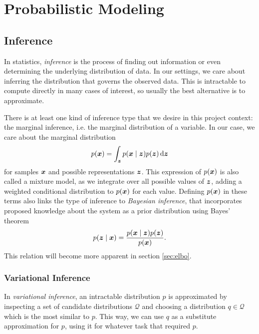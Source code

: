 \chapter{Probabilistic Modeling}


\section{Inference}
In statistics, \textit{inference} is the process of finding out information or even determining the underlying distribution of data. In our settings, we care about inferring the distribution that governs the observed data. This is intractable to compute directly in many cases of interest, so usually the best alternative is to approximate.

There is at least one kind of inference type that we desire in this project context: the marginal inference, i.e. the marginal distribution of a variable. In our case, we care about the marginal distribution 
\begin{equation}
    p(\bm{ x }) = \int_{\bm{ z }} p(\bm{ x } \mid \bm{ z }) p(\bm{ z }) \mathop{}\!\mathrm{d} \bm{ z } \label{eq:marginal_distribution}
\end{equation}
for samples $\bm{ x }$ and possible representations $\bm{ z }$. This expression of $p(\bm{ x })$ is also called a mixture model, as we integrate over all possible values of $\bm{ z }$, adding a weighted conditional distribution to $p(\bm{ x })$ for each value. Defining $p(\bm{ x })$ in these terms also links the type of inference to \textit{Bayesian inference}, that incorporates proposed knowledge about the system as a prior distribution using Bayes' theorem
\begin{equation}
    p(\bm{ z } \mid \bm{ x }) = \frac{p(\bm{ x } \mid \bm{ z }) p(\bm{ z })}{p(\bm{ x })}. \label{eq:bayes_theorem}
\end{equation}
This relation will become more apparent in section \ref{sec:elbo}.

\subsection{Variational Inference}
\label{sec:variational_inference}
In \textit{variational inference}, an intractable distribution $p$ is approximated by inspecting a set of candidate distributions $\mathcal{Q}$ and choosing a distribution $q \in \mathcal{Q}$ which is the most similar to $p$. This way, we can use $q$ as a substitute approximation for $p$, using it for whatever task that required $p$.

